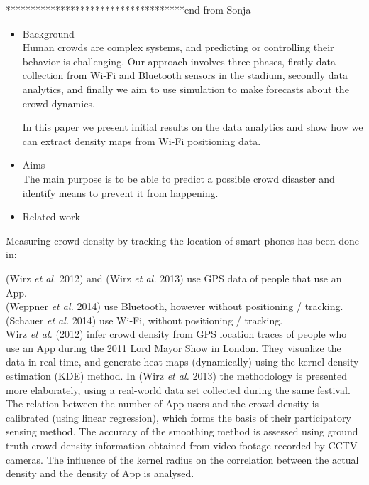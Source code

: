 \documentclass[10pt,a4paper]{article}
\begin{document}
************************************end from Sonja
\begin{itemize}

\item Background\\

Human crowds are complex systems, and predicting or controlling their behavior is challenging. Our approach involves three phases, firstly data collection from Wi-Fi and Bluetooth sensors in the stadium, secondly data analytics, and finally we aim to use simulation to make forecasts about the crowd dynamics. 

In this paper we present initial results on the data analytics and show how we can extract density maps from Wi-Fi positioning data. 

\item Aims\\

The main purpose is to be able to predict a possible crowd disaster and identify means to prevent it from happening. 

\item Related work\\

\end{itemize}

Measuring crowd density by tracking the location of smart phones has been done in:

(Wirz \textit{et al.} 2012) \cite{wirz:1} and (Wirz \textit{et al.} 2013) \cite{wirz:2} use GPS data of people that use an App.\\
(Weppner \textit{et al.} 2014) \cite{weppner:1} use Bluetooth, however without positioning / tracking.\\
(Schauer \textit{et al.} 2014) \cite{schauer:1} use Wi-Fi, without positioning / tracking.\\

Wirz \textit{et al.} (2012) \cite{wirz:1} infer crowd density from GPS location traces of people who use an App during the 2011 Lord Mayor Show in London. They visualize the data in real-time, and generate heat maps (dynamically) using the kernel density estimation (KDE) method. In (Wirz \textit{et al.} 2013) \cite{wirz:2} the methodology is presented more elaborately, using a real-world data set collected during the same festival. The relation between the number of App users and the crowd density is calibrated (using linear regression), which forms the basis of their participatory sensing method. 
The accuracy of the smoothing method is assessed using ground truth crowd density information obtained from video footage recorded by CCTV cameras. 
The influence of the kernel radius on the correlation between the actual density and the density of App is analysed.
\end{document}
